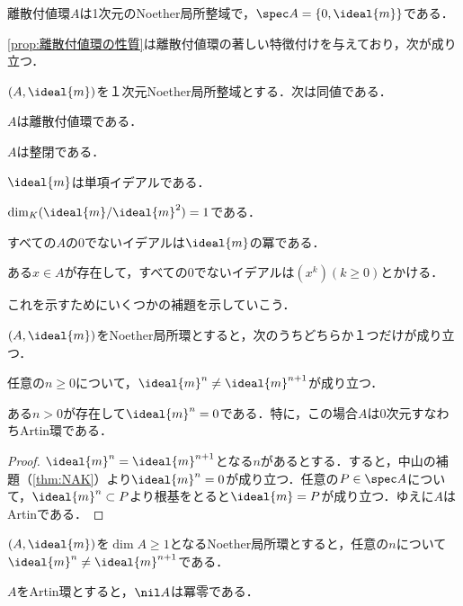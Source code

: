 \begin{cor}
	離散付値環$A$は1次元のNoether局所整域で，$\spec A=\{0,\ideal{m}\}$である．
\end{cor}

\ref{prop:離散付値環の性質}は離散付値環の著しい特徴付けを与えており，次が成り立つ．

\begin{thm}\label{thm:DVRの特徴づけ}
	$(A,\ideal{m})$を１次元Noether局所整域とする．次は同値である．
	\begin{sakura}
		\item $A$は離散付値環である．
		\item $A$は整閉である．
		\item $\ideal{m}$は単項イデアルである．
		\item $\dim_K (\ideal{m}/\ideal{m}^2)=1$である．
		\item すべての$A$の0でないイデアルは$\ideal{m}$の冪である．
		\item ある$x\in A$が存在して，すべての0でないイデアルは$(x^k) (k\geq0)$とかける．
	\end{sakura}
\end{thm}

これを示すためにいくつかの補題を示していこう．

\begin{prop}\label{prop:局所環がm^n=0ならArtin}
	$(A,\ideal{m})$をNoether局所環とすると，次のうちどちらか１つだけが成り立つ．
	\begin{sakura}
		\item 任意の$n\geq0$について，$\ideal{m}^n\neq\ideal{m}^{n+1}$が成り立つ．
		\item ある$n>0$が存在して$\ideal{m}^n=0$である．特に，この場合$A$は0次元すなわちArtin環である．
	\end{sakura}
\end{prop}

\begin{proof}
	$\ideal{m}^n=\ideal{m}^{n+1}$となる$n$があるとする．すると，中山の補題（\ref{thm:NAK}）より$\ideal{m}^n=0$が成り立つ．任意の$P\in\spec A$について，$\ideal{m}^n\subset P$より根基をとると$\ideal{m}=P$が成り立つ．ゆえに$A$はArtinである．
\end{proof}

\begin{cor}\label{lem:DVR-A}
	$(A,\ideal{m})$を$\dim A\geq1$となるNoether局所環とすると，任意の$n$について$\ideal{m}^n\neq\ideal{m}^{n+1}$である．
\end{cor}

\begin{lem}\label{lem:Artinならnil Aは冪零}
	$A$をArtin環とすると，$\nil A$は冪零である．
\end{lem}

